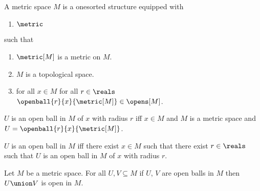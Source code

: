 \begin{theorem}\label{metric_induce_a_topology}
    


\end{theorem}






\begin{struct}\label{metric_space}  
    A metric space $M$ is a onesorted structure equipped with
    \begin{enumerate}
        \item $\metric$
    \end{enumerate}
    such that
    \begin{enumerate}
        \item \label{metric_space_metric}                   $\metric[M]$ is a metric on $M$.
        \item \label{metric_space_topology}                 $M$ is a topological space.
        \item \label{metric_space_opens}                    for all $x \in M$ for all $r \in \reals$ $\openball{r}{x}{\metric[M]} \in \opens[M]$.
    \end{enumerate}
\end{struct}

\begin{abbreviation}\label{descriptive_syntax_for_openball1}
    $U$ is an open ball in $M$ of $x$ with radius $r$ iff $x \in M$ and $M$ is a metric space and $U = \openball{r}{x}{\metric[M]}$.
\end{abbreviation}

\begin{abbreviation}\label{descriptive_syntax_for_openball2}
    $U$ is an open ball in $M$ iff there exist $x \in M$ such that there exist $r \in \reals$ such that $U$ is an open ball in $M$ of $x$ with radius $r$.
\end{abbreviation}

\begin{lemma}\label{union_of_open_balls_is_open}
    Let $M$ be a metric space.
    For all $U,V \subseteq M$ if $U$, $V$ are open balls in $M$ then $U \union V$ is open in $M$.
\end{lemma}








